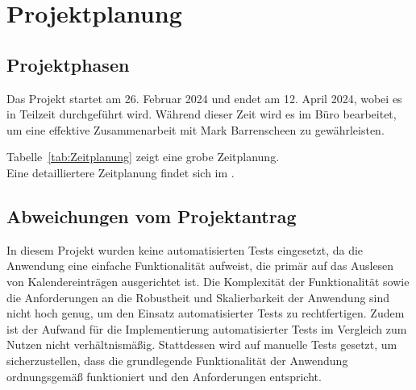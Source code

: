 \section{Projektplanung} 
\label{sec:Projektplanung}


\subsection{Projektphasen}
\label{sec:Projektphasen}

Das Projekt startet am 26. Februar 2024 und endet am 12. April 2024, wobei es in Teilzeit durchgeführt wird.
Während dieser Zeit wird es im Büro bearbeitet, um eine effektive Zusammenarbeit mit Mark Barrenscheen zu gewährleisten.

Tabelle~\ref{tab:Zeitplanung} zeigt eine grobe Zeitplanung.
\\
Eine detailliertere Zeitplanung findet sich im .


\subsection{Abweichungen vom Projektantrag}
\label{sec:AbweichungenProjektantrag}
In diesem Projekt wurden keine automatisierten Tests eingesetzt, da die Anwendung eine einfache Funktionalität aufweist, die primär auf das Auslesen von Kalendereinträgen ausgerichtet ist.
Die Komplexität der Funktionalität sowie die Anforderungen an die Robustheit und Skalierbarkeit der Anwendung sind nicht hoch genug, um den Einsatz automatisierter Tests zu rechtfertigen.
Zudem ist der Aufwand für die Implementierung automatisierter Tests im Vergleich zum Nutzen nicht verhältnismäßig.
Stattdessen wird auf manuelle Tests gesetzt, um sicherzustellen, dass die grundlegende Funktionalität der Anwendung ordnungsgemäß funktioniert und den Anforderungen entspricht.


